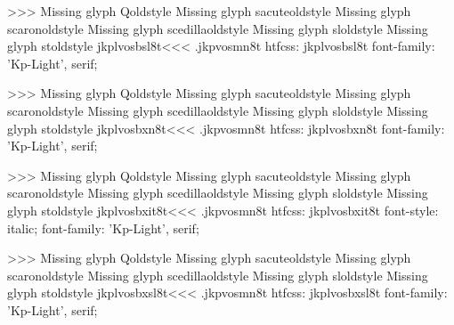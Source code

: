 >>>
Missing glyph	Qoldstyle
Missing glyph	sacuteoldstyle
Missing glyph	scaronoldstyle
Missing glyph	scedillaoldstyle
Missing glyph	sloldstyle
Missing glyph	stoldstyle
\<jkplvosbsl8t\><<<
.jkpvosmn8t
htfcss:  jkplvosbsl8t  font-family: 'Kp-Light', serif;

>>>
Missing glyph	Qoldstyle
Missing glyph	sacuteoldstyle
Missing glyph	scaronoldstyle
Missing glyph	scedillaoldstyle
Missing glyph	sloldstyle
Missing glyph	stoldstyle
\<jkplvosbxn8t\><<<
.jkpvosmn8t
htfcss:  jkplvosbxn8t  font-family: 'Kp-Light', serif;

>>>
Missing glyph	Qoldstyle
Missing glyph	sacuteoldstyle
Missing glyph	scaronoldstyle
Missing glyph	scedillaoldstyle
Missing glyph	sloldstyle
Missing glyph	stoldstyle
\<jkplvosbxit8t\><<<
.jkpvosmn8t
htfcss:  jkplvosbxit8t  font-style: italic; font-family: 'Kp-Light', serif;

>>>
Missing glyph	Qoldstyle
Missing glyph	sacuteoldstyle
Missing glyph	scaronoldstyle
Missing glyph	scedillaoldstyle
Missing glyph	sloldstyle
Missing glyph	stoldstyle
\<jkplvosbxsl8t\><<<
.jkpvosmn8t
htfcss:  jkplvosbxsl8t  font-family: 'Kp-Light', serif;

